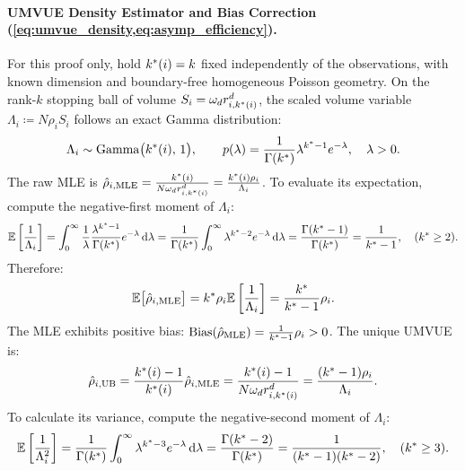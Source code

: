 \paragraph{UMVUE Density Estimator and Bias Correction
(\cref{eq:umvue_density,eq:asymp_efficiency}).}
For this proof only, hold $k^{*}(i)=k$ fixed independently of the
observations, with known dimension and boundary-free homogeneous Poisson
geometry. On the rank-$k$ stopping ball of volume
$S_i = \omega_d r_{i, k^{*}(i)}^d$,
the scaled volume variable $\Lambda_i \coloneqq N \rho_i S_i$
follows an exact Gamma distribution:
\begin{equation}
  \Lambda_i \sim \mathrm{Gamma}\bigl(k^{*}(i), \, 1\bigr), \qquad
  p(\lambda) = \frac{1}{\Gamma(k^{*})}\lambda^{k^{*} -
  1}e^{-\lambda}, \quad \lambda > 0.
\end{equation}
The raw MLE is $\hat{\rho}_{i, \mathrm{MLE}} = \frac{k^{*}(i)}{N
\omega_d r_{i, k^{*}(i)}^d} = \frac{k^{*}(i) \rho_i}{\Lambda_i}$.
To evaluate its expectation, compute the negative-first moment of $\Lambda_i$:
\begin{equation}
  \mathbb{E}\left[\frac{1}{\Lambda_i}\right] = \int_0^\infty
  \frac{1}{\lambda} \frac{\lambda^{k^{*} - 1}}{\Gamma(k^{*})}
  e^{-\lambda}\,\mathrm{d}\lambda
  = \frac{1}{\Gamma(k^{*})}\int_0^\infty \lambda^{k^{*} - 2}
  e^{-\lambda}\,\mathrm{d}\lambda = \frac{\Gamma(k^{*} -
  1)}{\Gamma(k^{*})} = \frac{1}{k^{*} - 1}, \quad (k^{*} \ge 2).
\end{equation}
Therefore:
\begin{equation}
  \mathbb{E}\bigl[\hat{\rho}_{i, \mathrm{MLE}}\bigr] = k^{*} \rho_i
  \mathbb{E}\left[\frac{1}{\Lambda_i}\right] = \frac{k^{*}}{k^{*} - 1}\rho_i.
\end{equation}
The \ac{MLE} exhibits positive bias:
$\operatorname{Bias}(\hat{\rho}_{\mathrm{MLE}}) = \frac{1}{k^{*} -
1}\rho_i > 0$.
The unique \ac{UMVUE} is:
\begin{equation}
  \hat{\rho}_{i, \mathrm{UB}} = \frac{k^{*}(i) - 1}{k^{*}(i)}
  \hat{\rho}_{i, \mathrm{MLE}} = \frac{k^{*}(i) - 1}{N \omega_d
  r_{i, k^{*}(i)}^d} = \frac{(k^{*} - 1)\rho_i}{\Lambda_i}.
\end{equation}
To calculate its variance, compute the negative-second moment of $\Lambda_i$:
\begin{equation}
  \mathbb{E}\left[\frac{1}{\Lambda_i^2}\right] =
  \frac{1}{\Gamma(k^{*})}\int_0^\infty \lambda^{k^{*} - 3}
  e^{-\lambda}\,\mathrm{d}\lambda = \frac{\Gamma(k^{*} -
  2)}{\Gamma(k^{*})} = \frac{1}{(k^{*} - 1)(k^{*} - 2)}, \quad
  (k^{*} \ge 3).
\end{equation}

